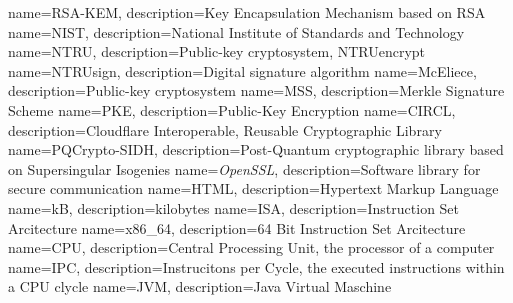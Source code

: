 {
    name=RSA-KEM,
    description={Key Encapsulation Mechanism based on RSA}
}
{
    name=NIST,
    description={National Institute of Standards and Technology}
}
{
    name=NTRU,
    description={Public-key cryptosystem, NTRUencrypt}
}
{
    name=NTRUsign,
    description={Digital signature algorithm}
}
{
    name=McEliece,
    description={Public-key cryptosystem}
}
{
    name=MSS,
    description={Merkle Signature Scheme}
}
{
    name=PKE,
    description={Public-Key Encryption}
}
{
    name=CIRCL,
    description={Cloudflare Interoperable, Reusable Cryptographic Library}
}
{
    name=PQCrypto-SIDH,
    description={Post-Quantum cryptographic library based on Supersingular Isogenies}
}
{
    name=\textit{OpenSSL},
    description={Software library for secure communication}
}
{
    name=HTML,
    description={Hypertext Markup Language}
}
{
    name=kB,
    description={kilobytes}
}
{
    name=ISA,
    description={Instruction Set Arcitecture}
}
{
    name=x86_64,
    description={64 Bit Instruction Set Arcitecture}
}
{
    name=CPU,
    description={Central Processing Unit, the processor of a computer}
}
{
    name=IPC,
    description={Instrucitons per Cycle, the executed instructions within a CPU clycle}
}
{
    name=JVM,
    description={Java Virtual Maschine}
}
